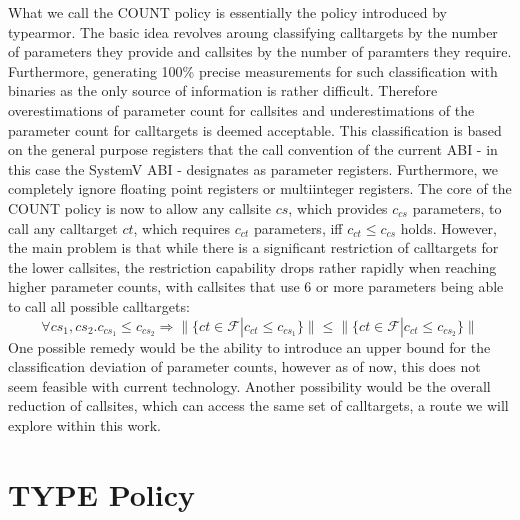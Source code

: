 What we call the COUNT policy is essentially the policy introduced by typearmor\cite{typearmor}. The basic idea revolves aroung classifying calltargets by the number of parameters they provide and callsites by the number of paramters they require. Furthermore, generating 100\% precise measurements for such classification with binaries as the only source of information is rather difficult. Therefore overestimations of parameter count for callsites and underestimations of the parameter count for calltargets is deemed acceptable. This classification is based on the general purpose registers that the call convention of the current ABI - in this case the SystemV ABI - designates as parameter registers. Furthermore, we completely ignore floating point registers or multiinteger registers. The core of the COUNT policy is now to allow any callsite $cs$, which provides $c_{cs}$ parameters, to call any calltarget $ct$, which requires $c_{ct}$ parameters, iff $c_{ct} \leq c_{cs}$ holds. However, the main problem is that while there is a significant restriction of calltargets for the lower callsites, the restriction capability drops rather rapidly when reaching higher parameter counts, with callsites that use 6 or more parameters being able to call all possible calltargets:
\[
	\forall cs_1, cs_2.  c_{cs_1} \leq c_{cs_2} \Longrightarrow  \| \{ct \in \mathcal{F} | c_{ct} \leq c_{cs_1} \} \| \leq \| \{ct \in \mathcal{F} | c_{ct} \leq c_{cs_2}  \} \|
\]
One possible remedy would be the ability to introduce an upper bound for the classification deviation of parameter counts, however as of now, this does not seem feasible with current technology. Another possibility would be the overall reduction of callsites, which can access the same set of calltargets, a route we will explore within this work.




\section{TYPE Policy}
\label{section:typepolicy}

